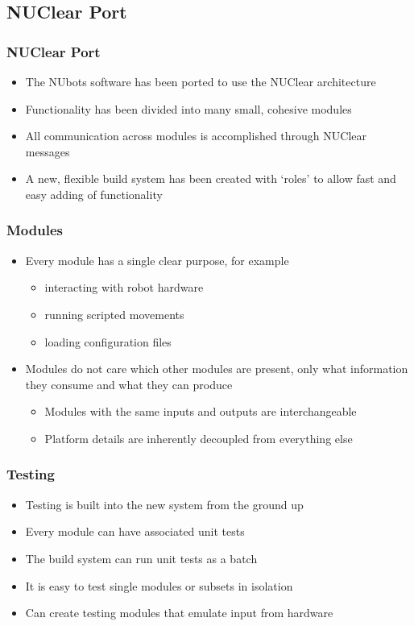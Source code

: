 \documentclass{beamer}
\begin{document}
\subsection{NUClear Port}
\begin{frame}
	\frametitle{NUClear Port}

	\begin{itemize}
		\item The NUbots software has been ported to use the NUClear architecture
		\item Functionality has been divided into many small, cohesive modules
		\item All communication across modules is accomplished through NUClear messages
		\item A new, flexible build system has been created with `roles' to allow fast and easy adding of functionality
	\end{itemize}
\end{frame}

\begin{frame}
	\frametitle{Modules}

	\begin{itemize}
		\item Every module has a single clear purpose, for example
		\begin{itemize}
			\item interacting with robot hardware
			\item running scripted movements
			\item loading configuration files
		\end{itemize}
		\item Modules do not care which other modules are present, only what information they consume and what they can produce
		\begin{itemize}
			\item Modules with the same inputs and outputs are interchangeable
			\item Platform details are inherently decoupled from everything else
		\end{itemize}
	\end{itemize}
\end{frame}

\begin{frame}
	\frametitle{Testing}

	\begin{itemize}
		\item Testing is built into the new system from the ground up
		\item Every module can have associated unit tests
		\item The build system can run unit tests as a batch
		\item It is easy to test single modules or subsets in isolation
		\item Can create testing modules that emulate input from hardware
	\end{itemize}
\end{frame}
\end{document}
